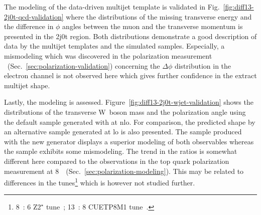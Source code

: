 
The modeling of the data-driven multijet template is validated in Fig.~\ref{fig:diff13-2j0t-qcd-validation} where the distributions of the missing transverse energy and the difference in $\phi$ angles between the muon and the transverse momentum is presented in the 2j0t region. Both distributions demonstrate a good description of data by the multijet templates and the simulated samples. Especially, a mismodeling which was discovered in the polarization measurement ~(Sec.~\ref{sec:polarization-validation}) concerning the $\Delta\phi$ distribution in the electron channel is not observed here which gives further confidence in the extract multijet shape.


Lastly, the \wjets modeling is assessed. Figure~\ref{fig:diff13-2j0t-wjet-validation} shows the distributions of the transverse W~boson mass and the polarization angle using the default \wjets sample generated with \MGAMC at \gls{nlo}. For comparison, the predicted shape by an alternative \wjets sample generated \MG at \gls{lo} is also presented. The sample produced with the new \MGAMC generator displays a superior modeling of both observables whereas the \MG \wjets sample exhibits some mismodeling. The trend in the ratios is somewhat different here compared to the observations in the top quark polarization measurement at 8~\TeV~(Sec.~\ref{sec:polarization-modeling}). This may be related to differences in the \PYTHIA tunes\footnote{8~\TeV: \PYTHIA{}6 $\mathrm{Z2}^\star$ tune~\cite{Chatrchyan:2011id}; 13~\TeV: \PYTHIA{}8 CUETP8M1 tune~\cite{Khachatryan:2015pea}.} which is however not studied further.

